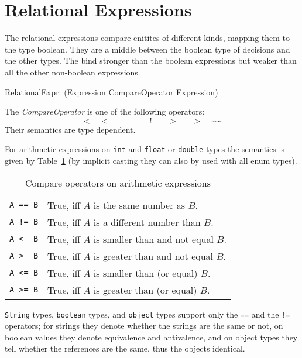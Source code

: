 \section{Relational Expressions}\label{sec:relational}

The relational expressions compare enitites of different kinds, mapping them to the type boolean.
They are a middle between the boolean type of decisions and the other types.
The bind stronger than the boolean expressions but weaker than all the other non-boolean expressions.

\begin{rail}
 RelationalExpr: (Expression CompareOperator Expression)
\end{rail}

The \emph{CompareOperator} is one of the following operators:
\[ \texttt{<} \;\;\;\;\; \texttt{<=} \;\;\;\;\; \texttt{==} \;\;\;\;\; \texttt{!=} \;\;\;\;\; \texttt{>=} \;\;\;\;\; \texttt{>} \;\;\;\;\; \texttt{\textasciitilde\textasciitilde} \]
Their semantics are type dependent.

For arithmetic expressions on \texttt{int} and \texttt{float} or \texttt{double} types
the semantics is given by Table~\ref{compandarithmetic} (by implicit casting they can also by used with all enum types).

\begin{table}[htbp]
  \centering
  \begin{tabularx}{\linewidth}{|l|X|} \hline
    \texttt{A == B} & True, iff $A$ is the same number as $B$. \\
    \texttt{A != B} & True, iff $A$ is a different number than $B$. \\
    \texttt{A <\ \ B} & True, iff $A$ is smaller than and not equal $B$. \\
    \texttt{A >\ \ B} & True, iff $A$ is greater than and not equal $B$. \\
    \texttt{A <= B} & True, iff $A$ is smaller than (or equal) $B$. \\
    \texttt{A >= B} & True, iff $A$ is greater than (or equal) $B$. \\ \hline
  \end{tabularx}
  \caption{Compare operators on arithmetic expressions}
  \label{compandarithmetic}
\end{table}

\texttt{String} types, \texttt{boolean} types, and \texttt{object} types support only the \texttt{==} and the \texttt{!=} operators;
for strings they denote whether the strings are the same or not,
on boolean values they denote equivalence and antivalence,
and on object types they tell whether the references are the same, thus the objects identical.

